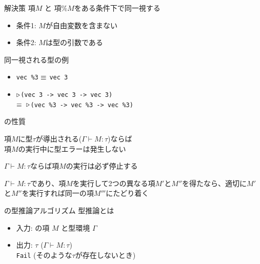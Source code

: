 \documentclass[dvipdfmx,aspectratio=169, 20pt]{beamer}
\begin{document}
\begin{frame}[fragile]{解決策}
    項\( M \) と 項\( \%M \)をある条件下で同一視する
    \begin{itemize}
        \item 条件1: \( M \)が自由変数を含まない
        \item 条件2: \( M \)は型の引数である
    \end{itemize}
    \begin{exampleblock}{同一視される型の例}
        \begin{itemize}
            \item \verb|vec %3| \( \equiv \) \verb|vec 3|
            \item \({\mathop{\triangleright}}\)\verb|(vec 3 -> vec 3 -> vec 3)| \\
                \( \equiv \)\ \({\mathop{\triangleright}}\)\verb|(vec %3 -> vec %3 -> vec %3)|
        \end{itemize}
    \end{exampleblock}
\end{frame}

\begin{frame}[fragile]{\LMD の性質}
    \begin{theorem}[型安全性]
        項\(M\)に型\(\tau\)が導出される(\(\Gamma \vdash M : \tau \))ならば\\
        項\(M\)の実行中に型エラーは発生しない
    \end{theorem}
    \begin{theorem}[強正規化性]
        \(\Gamma \vdash M : \tau \)ならば項\(M\)の実行は必ず停止する
    \end{theorem}
    \begin{theorem}[合流性]
        \(\Gamma \vdash M : \tau \)であり、項\(M\)を実行して2つの異なる項\(M'\)と\(M''\)を得たなら、適切に\(M'\)と\(M''\)を実行すれば同一の項\(M'''\)にたどり着く
    \end{theorem}
\end{frame}

\begin{frame}[fragile]{\LMD の型推論アルゴリズム}
    型推論とは
    \begin{itemize}
        \item 入力: \LMD の項 $M$ と型環境 $\Gamma$
        \item 出力: \( \tau \) \hspace{10mm} (\( \Gamma \vdash M : \tau \)) \\
            \hspace{10mm} \hspace{4mm} {\tt Fail} (そのような\( \tau \)が存在しないとき)
    \end{itemize}

\end{frame}
\end{document}
